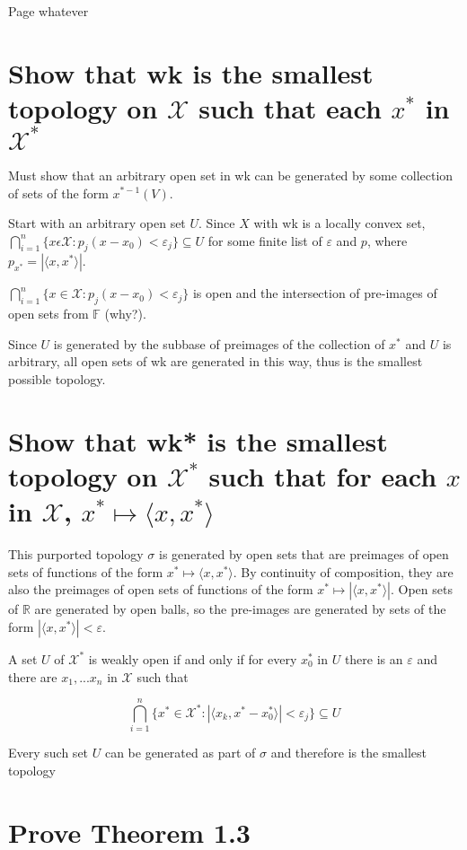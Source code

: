 \documentclass{article}
\begin{document}
Page whatever
\section{Show that wk is the smallest topology on $\mathscr{X}$ such that each $x^*$ in $\mathscr{X}^*$}

Must show that an arbitrary open set in wk can be generated by some collection of sets of the form $x^{*-1}(V)$.

Start with an arbitrary open set $U$. Since $X$ with wk is a locally convex set, $\bigcap^n_{i=1}\{x\epsilon \mathscr{X} : p_j( x-x_0) < \varepsilon_j\} \subseteq U$ for some finite list of $\varepsilon$ and $p$, where $p_{x^*}=|\langle x,x^*\rangle|$.

 $\bigcap^n_{i=1}\{x\in \mathscr{X} : p_j( x-x_0) < \varepsilon_j\}$ is open and the intersection of pre-images of open sets from $\mathbb{F}$ (why?).

Since $U$ is generated by the subbase of preimages of the collection of $x^*$ and $U$ is arbitrary, all open sets of wk are generated in this way, thus is the smallest possible topology.

\section{Show that wk* is the smallest topology on $\mathscr{X}^*$ such that for each $x$ in $\mathscr{X}$, $x^* \mapsto \langle x, x^* \rangle$}


This purported topology $\sigma$ is generated by open sets that are preimages of open sets of functions of the form $x^* \mapsto \langle x, x^* \rangle$. By continuity of composition, they are also the preimages of open sets of functions of the form $x^* \mapsto | \langle x, x^* \rangle | $. Open sets of $\mathbb{R}$ are generated by open balls, so the pre-images are generated by sets of the form $| \langle x, x^* \rangle | < \varepsilon $.

A set $U$ of $\mathscr{X}^*$ is weakly open if and only if for every $x^*_0$ in $U$ there is an $\varepsilon$ and there are $x_1, ... x_n$ in $\mathscr{X}$ such that 

$$\bigcap^n_{i=1}\{x^*\in \mathscr{X}^* : |\langle x_k, x^* - x^*_0 \rangle| < \varepsilon_j\} \subseteq U$$

Every such set $U$ can be generated as part of $\sigma$ and therefore is the smallest topology 

\section{Prove Theorem 1.3}
\end{document}
